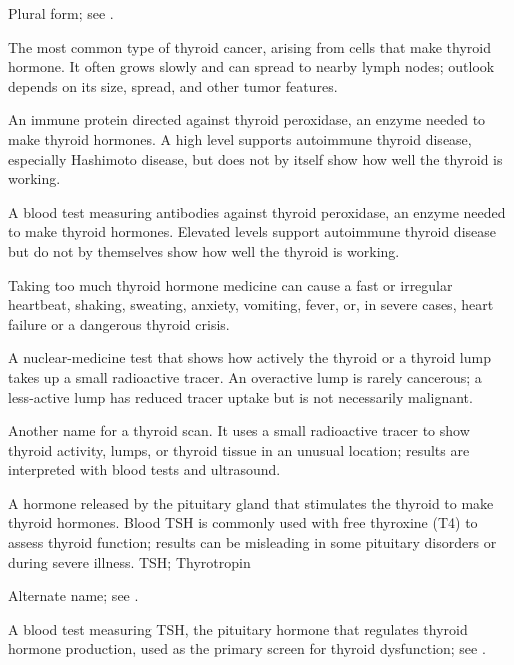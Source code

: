  Plural form; see .

 The most common type of thyroid cancer, arising from cells that make thyroid hormone. It often grows slowly and can spread to nearby lymph nodes; outlook depends on its size, spread, and other tumor features.

 An immune protein directed against thyroid peroxidase, an enzyme needed to make thyroid hormones. A high level supports autoimmune thyroid disease, especially Hashimoto disease, but does not by itself show how well the thyroid is working.

 A blood test measuring antibodies against thyroid peroxidase, an enzyme needed to make thyroid hormones. Elevated levels support autoimmune thyroid disease but do not by themselves show how well the thyroid is working.

 Taking too much thyroid hormone medicine can cause a fast or irregular heartbeat, shaking, sweating, anxiety, vomiting, fever, or, in severe cases, heart failure or a dangerous thyroid crisis.

 A nuclear-medicine test that shows how actively the thyroid or a thyroid lump takes up a small radioactive tracer. An overactive lump is rarely cancerous; a less-active lump has reduced tracer uptake but is not necessarily malignant.

 Another name for a thyroid scan. It uses a small radioactive tracer to show thyroid activity, lumps, or thyroid tissue in an unusual location; results are interpreted with blood tests and ultrasound.

 A hormone released by the pituitary gland that stimulates the thyroid to make thyroid hormones. Blood TSH is commonly used with free thyroxine (T4) to assess thyroid function; results can be misleading in some pituitary disorders or during severe illness.
\synonyms
TSH; Thyrotropin

 Alternate name; see .

 A blood test measuring TSH, the pituitary hormone that regulates thyroid hormone production, used as the primary screen for thyroid dysfunction; see .

